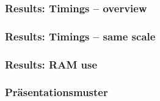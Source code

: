 \begin{frame}[c]
    \centering
    \frametitle{Results: Timings -- overview}
    \resizebox{!}{.35\textheight}{
        
    }
\end{frame}

\begin{frame}[c]
    \centering
    \frametitle{Results: Timings -- same scale}
    \resizebox{!}{.35\textheight}{
        
    }
\end{frame}

\begin{frame}[c]
    \frametitle{Results: RAM use}
    \centering
    
\end{frame}



\PraesentationStartseiteFlaggen



\PraesentationTitelseite %


\begin{frame}
\end{frame}

\PraesentationMasterWeissSchwarz

\begin{frame}
    \frametitle{Präsentationsmuster}
\end{frame}



